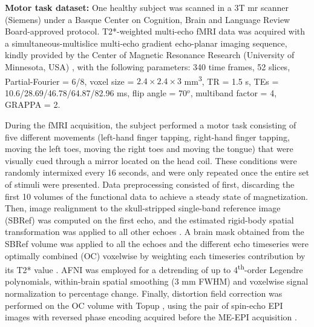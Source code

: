 \textbf{Motor task dataset:} One healthy subject was scanned in a 3T
\acrshort*{mr} scanner (Siemens) under a Basque Center on Cognition, Brain and
Language Review Board-approved protocol. T2*-weighted multi-echo fMRI data was
acquired with a simultaneous-multislice multi-echo gradient echo-planar imaging
sequence, kindly provided by the Center of Magnetic Resonance Research
(University of Minnesota, USA)
\citep{Feinberg2010MultiplexedEchoPlanar,Moeller2010MultibandmultisliceGE,Setsompop2011Blippedcontrolledaliasing},
with the following parameters: 340 time frames, 52 slices, Partial-Fourier =
6/8, voxel size = $2.4\times2.4\times3$ mm\textsuperscript{3}, TR = 1.5 s, TEs =
10.6/28.69/46.78/64.87/82.96 ms, flip angle = 70\(^o\), multiband factor = 4,
GRAPPA = 2.

During the fMRI acquisition, the subject performed a motor task consisting of
five different movements (left-hand finger tapping, right-hand finger tapping,
moving the left toes, moving the right toes and moving the tongue) that were
visually cued through a mirror located on the head coil. These conditions were
randomly intermixed every 16 seconds, and were only repeated once the entire set
of stimuli were presented. Data preprocessing consisted of first, discarding the
first 10 volumes of the functional data to achieve a steady state of
magnetization. Then, image realignment to the skull-stripped single-band
reference image (SBRef) was computed on the first echo, and the estimated
rigid-body spatial transformation was applied to all other echoes
\citep{Jenkinson2012FSL,Jenkinson2001globaloptimisationmethod}. A brain mask
obtained from the SBRef volume was applied to all the echoes and the different
echo timeseries were optimally combined (OC) voxelwise by weighting each
timeseries contribution by its T2* value
\citep{Posse1999EnhancementBOLDcontrast}. AFNI
\citep{Cox1996AFNISoftwareAnalysis} was employed for a detrending of up to
4\textsuperscript{th}-order Legendre polynomials, within-brain spatial smoothing
(3 mm FWHM) and voxelwise signal normalization to percentage change. Finally,
distortion field correction was performed on the OC volume with Topup
\citep{Andersson2003Howcorrectsusceptibility}, using the pair of spin-echo EPI
images with reversed phase encoding acquired before the ME-EPI acquisition
\citep{Glasser2016HumanConnectomeProjects}.

